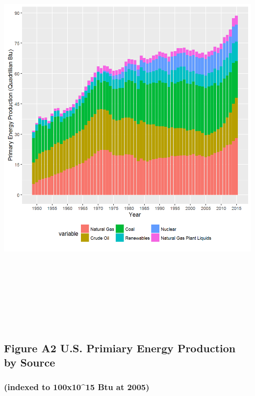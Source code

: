 \documentclass[]{article}
\begin{document}
\includegraphics[height=8.33333in]{images/EIAdata_us_primenrg_prod.png}

\newpage

\subsection{Figure A2 U.S. Primiary Energy Production by
Source}\label{figure-a2-u.s.-primiary-energy-production-by-source}

\subsubsection{(indexed to 100x10\^{}15 Btu at
2005)}\label{indexed-to-100x1015-btu-at-2005}
\end{document}
